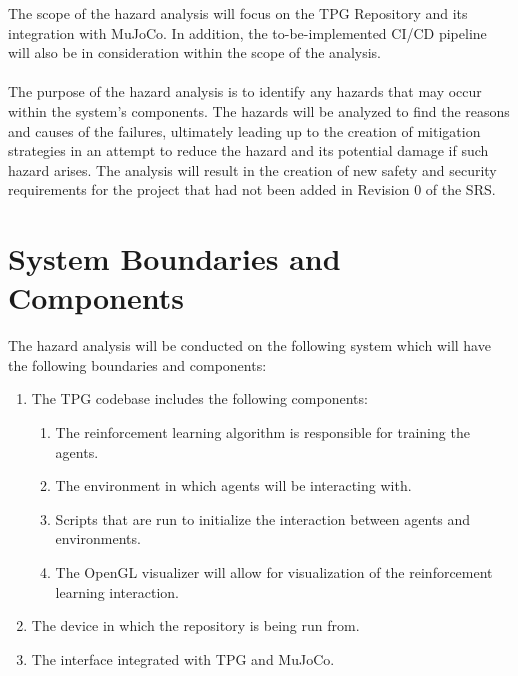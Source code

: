 \documentclass{article}
\begin{document}

The scope of the hazard analysis will focus on the TPG Repository and its integration with MuJoCo. In addition, the to-be-implemented CI/CD pipeline will also be in consideration within the scope of the analysis. 
\\\\
The purpose of the hazard analysis is to identify any hazards that may occur within the system’s components. The hazards will be analyzed to find the reasons and causes of the failures, ultimately leading up to the creation of mitigation strategies in an attempt to reduce the hazard and its potential damage if such hazard arises. The analysis will result in the creation of new safety and security requirements for the project that had not been added in Revision 0 of the SRS.

\section{System Boundaries and Components}


The hazard analysis will be conducted on the following system which will have the following boundaries and components:
\begin{enumerate}
    \item The TPG codebase includes the following components:
    \begin{enumerate}[label=(\alph*)]
        \item The reinforcement learning algorithm is responsible for training the agents.
        \item The environment in which agents will be interacting with.
        \item Scripts that are run to initialize the interaction between agents and environments.
        \item The OpenGL visualizer will allow for visualization of the reinforcement learning interaction. 
    \end{enumerate}
    \item The device in which the repository is being run from.
    \item The interface integrated with TPG and MuJoCo.
\end{enumerate}
\end{document}
